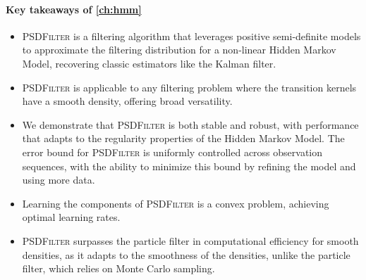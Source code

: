 \paragraph{Key takeaways of \cref{ch:hmm}}
\begin{itemize}
    \item \textsc{PSDFilter} is a filtering algorithm that leverages positive semi-definite models to approximate the filtering distribution for a non-linear Hidden Markov Model, recovering classic estimators like the Kalman filter.
    \item \textsc{PSDFilter} is applicable to any filtering problem where the transition kernels have a smooth density, offering broad versatility.
    \item We demonstrate that \textsc{PSDFilter} is both stable and robust, with performance that adapts to the regularity properties of the Hidden Markov Model. The error bound for \textsc{PSDFilter} is uniformly controlled across observation sequences, with the ability to minimize this bound by refining the model and using more data.
    \item Learning the components of \textsc{PSDFilter} is a convex problem, achieving optimal learning rates.
    \item \textsc{PSDFilter} surpasses the particle filter in computational efficiency for smooth densities, as it adapts to the smoothness of the densities, unlike the particle filter, which relies on Monte Carlo sampling.
\end{itemize}
